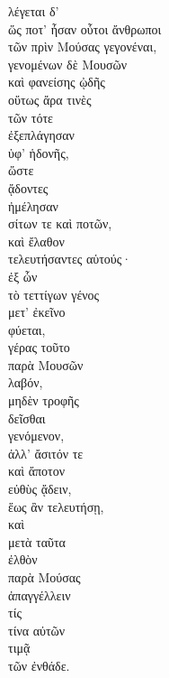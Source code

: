 {\large
\begin{greek}
\noindent λέγεται δ' \\
\tabto{2em} ὥς ποτ' ἦσαν οὗτοι ἄνθρωποι \\
\tabto{4em} τῶν πρὶν Μούσας γεγονέναι, \\
\tabto{2em} γενομένων δὲ Μουσῶν \\
\tabto{2em} καὶ φανείσης ᾠδῆς \\

\tabto{4em} οὕτως ἄρα τινὲς \\
\tabto{6em} τῶν τότε \\
\tabto{4em} ἐξεπλάγησαν \\
\tabto{6em} ὑφ' ἡδονῆς, \\
\tabto{4em} ὥστε \\
\tabto{4em} ᾄδοντες \\
\tabto{4em} ἠμέλησαν \\
\tabto{6em} σίτων τε καὶ ποτῶν, \\
\tabto{4em} καὶ ἔλαθον \\
\tabto{6em} τελευτήσαντες αὑτούς·\\
\tabto{6em} ἐξ ὧν \\
\tabto{6em} τὸ τεττίγων γένος \\
\tabto{8em} μετ' ἐκεῖνο \\
\tabto{6em} φύεται, \\
\tabto{6em} γέρας τοῦτο \\
\tabto{8em} παρὰ Μουσῶν \\
\tabto{6em} λαβόν, \\
\tabto{8em} μηδὲν τροφῆς \\
\tabto{6em} δεῖσθαι \\
\tabto{6em} γενόμενον, \\
\tabto{6em} ἀλλ' ἄσιτόν τε \\
\tabto{6em} καὶ ἄποτον \\
\tabto{6em} εὐθὺς ᾄδειν, \\
\tabto{8em} ἕως ἂν τελευτήσῃ, \\
\tabto{6em} καὶ \\
\tabto{8em} μετὰ ταῦτα \\
\tabto{6em} ἐλθὸν \\
\tabto{8em} παρὰ Μούσας \\
\tabto{8em} ἀπαγγέλλειν \\

\tabto{10em} τίς \\
\tabto{10em} τίνα αὐτῶν \\
\tabto{10em} τιμᾷ \\
\tabto{12em} τῶν ἐνθάδε. \\

\end{greek}
}

